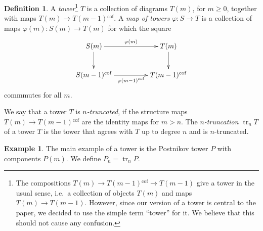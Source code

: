 \documentclass[12pt,a4wide]{article}
\theoremstyle{plain}
\theoremstyle{definition}
\newtheorem*{sdefinition}{Definition}
\newtheorem*{example}{Example}
\newcommand{\cofr}{\mathrm{cof}}
\newcommand{\fibr}{\mathrm{fib}}
\newcommand{\towercompmap}[2]{#1(#2)}
\newcommand{\varphim}{\towercompmap{\varphi}{\them}}
\newcommand{\varphimmo}{\towercompmap{\varphi}{\them-1}}
\newcommand{\them}{m}
\newcommand{\then}{n}
\newcommand{\thedim}{{n}}
\newcommand{\Pnew}{{P_\thedim}}
\renewcommand\:{\colon}
\begin{document}
\newcommand{\thei}{i}
\newcommand{\cofrst}[1]{#1{}^{\cofr}}
\newcommand{\fibrst}[1]{#1{}^{\fibr}}
\newcommand{\susp}[2]{#1[#2]}
\newcommand{\towercomp}[2]{#1(#2)}
\newcommand{\Tzero}{\towercomp{T}{0}}
\newcommand{\Tn}{\towercomp{T}{\then}}
\newcommand{\Tnmo}{\towercomp{T}{\then-1}}
\newcommand{\Tnmoc}{\cofrst{\towercomp{T}{\then-1}}}
\newcommand{\Ti}{\towercomp{T}{\thei}}
\newcommand{\Timo}{\towercomp{T}{\thei-1}}
\newcommand{\Timoc}{\cofrst{\towercomp{T}{\thei-1}}}
\newcommand{\Tm}{\towercomp{T}{\them}}
\newcommand{\Tmmo}{\towercomp{T}{\them-1}}
\newcommand{\Tmmoc}{\cofrst{\towercomp{T}{\them-1}}}
\newcommand{\Szero}{\towercomp{S}{0}}
\newcommand{\Sn}{\towercomp{S}{\then}}
\newcommand{\Snmo}{\towercomp{S}{\then-1}}
\newcommand{\Snmoc}{\cofrst{\towercomp{S}{\then-1}}}
\newcommand{\Si}{\towercomp{S}{\thei}}
\newcommand{\Simo}{\towercomp{S}{\thei-1}}
\newcommand{\Simoc}{\cofrst{\towercomp{S}{\thei-1}}}
\newcommand{\Sm}{\towercomp{S}{\them}}
\newcommand{\Smmo}{\towercomp{S}{\them-1}}
\newcommand{\Smmoc}{\cofrst{\towercomp{S}{\them-1}}}
\newcommand{\Rzero}{\towercomp{R}{0}}
\newcommand{\Rn}{\towercomp{R}{\then}}
\newcommand{\Rnmo}{\towercomp{R}{\then-1}}
\newcommand{\Rnmoc}{\cofrst{\towercomp{R}{\then-1}}}
\newcommand{\trunc}[2]{\operatorname{tr}_{#2} #1}

\begin{sdefinition}
A \emph{tower}\footnote{%
	The compositions $\Tm \to \Tmmoc \to \Tmmo$ give a tower in the usual sense, i.e.\ a collection of objects $\Tm$ and maps $\Tm \to \Tmmo$. However, since our version of a tower is central to the paper, we decided to use the simple term ``tower'' for it. We believe that this should not cause any confusion.
} $T$ is a collection of diagrams $\Tm$, for $\them \geq 0$, together with maps $\Tm \to \Tmmoc$. A \emph{map of towers} $\varphi \colon S \to T$ is a collection of maps $\varphim \colon \Sm \to \Tm$ for which the square
\[\xymatrix@C=4pc{
\Sm \ar[r]^-{\varphim} \ar[d] & \Tm \ar[d] \\
\Smmoc \ar[r]_-{\cofrst{\varphimmo}} & \Tmmoc
}\]
commmutes for all $\them$.

We say that a tower $T$ is \emph{$\then$-truncated}, if the structure maps $\Tm \to \Tmmoc$ are the identity maps for $\them > \then$. The \emph{$\then$-truncation} $\trunc{T}{\then}$ of a tower $T$ is the tower that agrees with $T$ up to degree $\then$ and is $\then$-truncated.
\end{sdefinition}

\begin{example}
The main example of a tower is the Postnikov tower $P$ with components $\towercomp{P}{\them}$. We define $\Pnew = \trunc{P}{\then}$.
\end{example}
\end{document}
